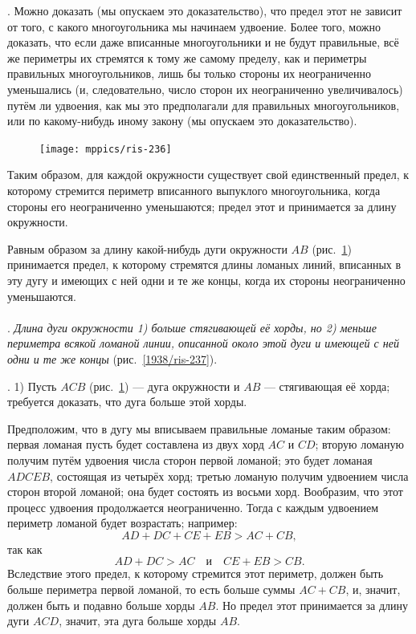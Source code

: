 \documentclass[twoside]{book}
\begin{document}
\smallskip
{}.
Можно доказать (мы опускаем это доказательство), что предел этот не зависит от того, с какого многоугольника мы начинаем удвоение.
Более того, можно доказать, что если даже вписанные многоугольники и не будут правильные, всё же периметры их стремятся к тому же самому пределу, как и периметры правильных многоугольников, лишь бы только стороны их неограниченно уменьшались (и, следовательно, число сторон их неограниченно увеличивалось) путём ли удвоения, как мы это предполагали для правильных многоугольников, или по какому-нибудь иному закону (мы опускаем это доказательство).

\begin{figure}
\centering
\texttt{[image: mppics/ris-236]}
\caption{}\label{1938/ris-236}
\end{figure}

{\sloppy

Таким образом, для каждой окружности существует свой единственный предел, к которому стремится периметр вписанного выпуклого многоугольника, когда стороны его неограниченно уменьшаются;
предел этот и принимается за длину окружности.

}

Равным образом за длину какой-нибудь дуги окружности $AB$ (рис.~\ref{1938/ris-236}) принимается предел, к которому стремятся длины ломаных линий, вписанных в эту дугу и имеющих с ней одни и те же концы, 
когда их стороны неограниченно уменьшаются.

\paragraph{}\label{1938/235}
.
\emph{Длина дуги окружности
1) больше стягивающей её хорды, но 2) меньше периметра всякой ломаной линии, описанной около этой дуги и имеющей с ней одни и те же концы} (рис.~\ref{1938/ris-237}).

.
1) Пусть $ACB$ (рис.~\ref{1938/ris-236}) — дуга окружности и $AB$ — стягивающая её хорда;
требуется доказать, что дуга больше этой хорды.

Предположим, что в дугу мы вписываем правильные ломаные таким образом:
первая ломаная пусть будет составлена из двух хорд $AC$ и $CD$;
вторую ломаную получим путём удвоения числа сторон первой ломаной;
это будет ломаная $ADCEB$, состоящая из четырёх хорд;
третью ломаную получим удвоением числа сторон второй ломаной;
она будет состоять из восьми хорд.
Вообразим, что этот процесс удвоения продолжается неограниченно.
Тогда с каждым удвоением периметр ломаной будет возрастать;
например:
\[AD+DC+CE+EB>AC+CB,\]
так как
\[AD+DC>AC\quad\text{и}\quad CE+EB>CB.\]
Вследствие этого предел, к которому стремится этот периметр, должен быть больше периметра первой ломаной, то есть больше суммы $AC+CB$, и, значит, должен быть и подавно больше хорды $AB$.
Но предел этот принимается за длину дуги $ACD$, значит, эта дуга больше хорды $AB$.
\end{document}
